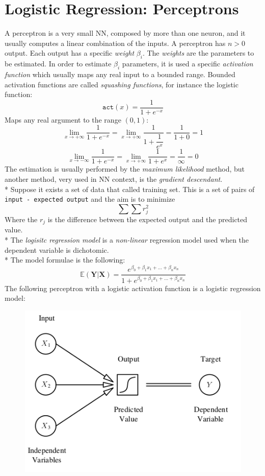 \documentclass[10pt,a4paper]{article}
\begin{document}
	\section{Logistic Regression: Perceptrons}
	A perceptron is a very small NN, composed by more than one neuron, and it usually computes a linear combination of the inputs.
	A perceptron has $n>0$ output. Each output has a specific \emph{weight} $\beta_i$. The \emph{weights} are the parameters to be estimated. In order to estimate $\beta_i$ parameters, it is used a specific \emph{activation function} which usually maps any real input to a bounded range. Bounded activation functions are called \emph{squashing functions}, for instance the logistic function:
	$$
	\texttt{act}(x) = \dfrac{1}{1+e^{-x}}
	$$
	Maps any real argument to the range $(0,1)$:
	$$
	\lim_{x\rightarrow +\infty} \dfrac{1}{1+e^{-x}} = 	\lim_{x\rightarrow +\infty} \dfrac{1}{1+\dfrac{1}{e^x}} = \dfrac{1}{1+0} = 1
	$$
	$$
	\lim_{x\rightarrow -\infty} \dfrac{1}{1+e^{-x}} = 	\lim_{x\rightarrow +\infty} \dfrac{1}{1+{e^x}} = \dfrac{1}{\infty} = 0
	$$
	The estimation is usually performed by the \emph{maximum likelihood} method, but another method, very used in NN context, is the \emph{gradient descendant}.\\*
	Suppose it exists a set of data that called training set. This is a set of pairs of  \texttt{input - expected output} and the aim is to minimize
	$$
	\sum \sum r_j^2
	$$
	Where the $r_j$ is the difference between the expected output and the predicted value.\\*
	The \emph{logisitc regression model} is a \emph{non-linear} regression model used when the dependent variable is dichotomic.\\*
	The model formulae is the following:
	$$
	\mathbb{E}(\textbf{Y}|\textbf{X}) = \dfrac{e^{\beta_0 + \beta_1x_1+\dots+\beta_n x_n}}{1 +e^{\beta_0 + \beta_1x_1+\dots+\beta_n x_n} }
	$$
	The following perceptron with a logistic activation function is a logistic regression model:
		\begin{figure}[h!]
		\centering
		\includegraphics[scale=1.7]{img/logreg}
	\end{figure}\newpage
\end{document}
